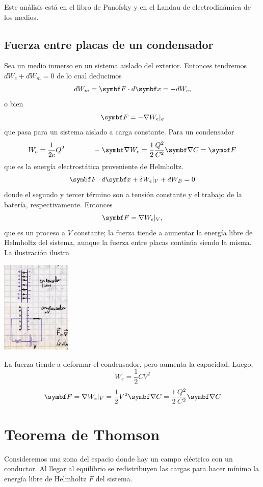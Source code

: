 \documentclass[10pt,oneside]{CBFT_book}
\begin{document}
Este análisis está en el libro de Panofsky y en el Landau de electrodinámica de los medios.

\subsection{Fuerza entre placas de un condensador}

Sea un medio inmerso en un sistema aislado del exterior. Entonces tendremos $dW_e + dW_m =0$ de lo
cual deducimos
\[
	dW_m = \vb{F}\cdot d\vbx = -dW_e,
\]
o bien
\[
	\vb{F} = - \nabla W_e|_q
\]
que pasa para un sistema aislado a carga constante.
Para un condensador
\[
	W_e = \frac{1}{2c} Q^2 \qquad \qquad -\Nabla W_e = \frac{1}{2} \frac{Q^2}{C^2} \Nabla C = \vb{F}
\]
que es la energía electrostática proveniente de Helmholtz.
\[
	\vb{F}\cdot d\vbx + \delta W_e|_V + dW_B = 0
\]
donde el segundo y tercer término son a tensión constante y el trabajo de la batería, respectivamente.
Entonces
\[
	\vb{F} = \nabla W_e|_V,
\]
que es un proceso a $V$ constante; la fuerza tiende a aumentar la energía libre de Helmholtz del
sistema, aunque la fuerza entre placas continúa siendo la misma.
La ilustración ilustra

\includegraphics[width=0.25\textwidth]{images/fig_ft1_fuerza_placas_condensador.jpg}

La fuerza tiende a deformar el condensador, pero aumenta la capacidad.
Luego,
\[
	W_e = \frac{1}{2} C V^2
\]
\[
	\vb{F} = \nabla W_e|_V = \frac{1}{2} V^2 \Nabla C = \frac{1}{2} \frac{Q^2}{C^2} \Nabla C
\]


\section{Teorema de Thomson}

Consideremos una zona del espacio donde hay un campo eléctrico con un conductor.
Al llegar al equilibrio se redistribuyen las cargas para hacer mínimo la energía libre de
Helmholtz $F$ del sistema.
\end{document}

